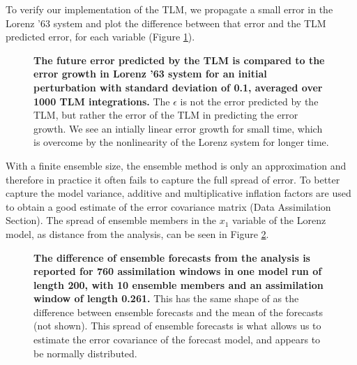 \documentclass[10pt,letterpaper]{article}
\begin{document}
To verify our implementation of the TLM, we propagate a small error in the Lorenz '63 system and plot the difference between that error and the TLM predicted error, for each variable (Figure \ref{fig:TLMverification}).

\begin{figure}[h]
  \centering
  \caption[The future error predicted by the TLM is compared to the error growth in Lorenz '63 system for an initial perturbation with standard deviation of 0.1, averaged over 1000 TLM integrations]{
\textbf{    The future error predicted by the TLM is compared to the error growth in Lorenz '63 system for an initial perturbation with standard deviation of 0.1, averaged over 1000 TLM integrations.
}    The $\epsilon$ is not the error predicted by the TLM, but rather the error of the TLM in predicting the error growth.
    We see an intially linear error growth for small time, which is overcome by the nonlinearity of the Lorenz system for longer time.
  }
  \label{fig:TLMverification}
\end{figure}

With a finite ensemble size, the ensemble method is only an approximation and therefore in practice it often fails to capture the full spread of error.
To better capture the model variance, additive and multiplicative inflation factors are used to obtain a good estimate of the error covariance matrix (Data Assimilation Section).
The spread of ensemble members in the $x_1$ variable of the Lorenz model, as distance from the analysis, can be seen in Figure \ref{fig:EnKFhist}.

\begin{figure}[h]
  \centering
  \caption[The difference of ensemble forecasts from the analysis is reported for 760 assimilation windows in one model run of length 200, with 10 ensemble members and an assimilation window of length 0.261]{
\textbf{    The difference of ensemble forecasts from the analysis is reported for 760 assimilation windows in one model run of length 200, with 10 ensemble members and an assimilation window of length 0.261.
}    This has the same shape of as the difference between ensemble forecasts and the mean of the forecasts (not shown).
    This spread of ensemble forecasts is what allows us to estimate the error covariance of the forecast model, and appears to be normally distributed.
  }
  \label{fig:EnKFhist}
\end{figure}
\end{document}
